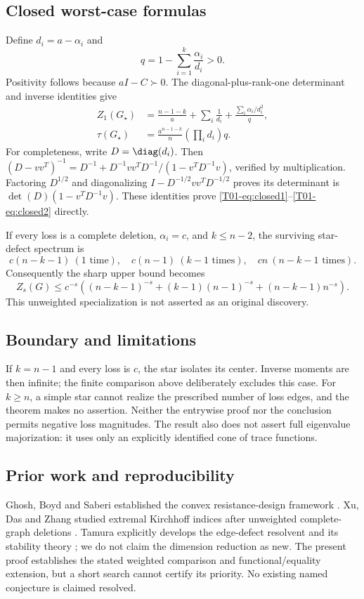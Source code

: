 \documentclass[11pt,a4paper]{article}
\theoremstyle{definition}\newtheorem{definition}[theorem]{Definition}
\theoremstyle{remark}\newtheorem{remark}[theorem]{Remark}
\numberwithin{equation}{section}
\begin{document}
\subsection{Closed worst-case formulas}\label{T01-sec-4}
Define $d_i=a-\alpha_i$ and
\[
 q=1-\sum_{i=1}^k\frac{\alpha_i}{d_i}>0.
\]
Positivity follows because $aI-C\succ0$. The diagonal-plus-rank-one determinant and inverse identities give
\begin{align}
 Z_1(G_\star)&=\frac{n-1-k}{a}+\sum_i\frac1{d_i}
 +\frac{\sum_i\alpha_i/d_i^2}{q},\label{T01-eq:closed1}\\
 \tau(G_\star)&=\frac{a^{n-1-k}}n\left(\prod_i d_i\right)q.\label{T01-eq:closed2}
\end{align}
For completeness, write $D=\diag(d_i)$. Then
$(D-vv^T)^{-1}=D^{-1}+D^{-1}vv^TD^{-1}/(1-v^TD^{-1}v)$, verified by multiplication. Factoring $D^{1/2}$ and diagonalizing $I-D^{-1/2}vv^TD^{-1/2}$ proves its determinant is $\det(D)(1-v^TD^{-1}v)$. These identities prove \eqref{T01-eq:closed1}--\eqref{T01-eq:closed2} directly.

If every loss is a complete deletion, $\alpha_i=c$, and $k\le n-2$, the surviving star-defect spectrum is
\[
 c(n-k-1)\ (1\text{ time}),\quad c(n-1)\ (k-1\text{ times}),\quad
 cn\ (n-k-1\text{ times}).
\]
Consequently the sharp upper bound becomes
\[
 Z_s(G)\le c^{-s}\left((n-k-1)^{-s}+(k-1)(n-1)^{-s}+(n-k-1)n^{-s}\right).
\]
This unweighted specialization is not asserted as an original discovery.

\subsection{Boundary and limitations}\label{T01-sec-5}
If $k=n-1$ and every loss is $c$, the star isolates its center. Inverse moments are then infinite; the finite comparison above deliberately excludes this case. For $k\ge n$, a simple star cannot realize the prescribed number of loss edges, and the theorem makes no assertion. Neither the entrywise proof nor the conclusion permits negative loss magnitudes. The result also does not assert full eigenvalue majorization: it uses only an explicitly identified cone of trace functions.

\subsection{Prior work and reproducibility}\label{T01-sec-6}
Ghosh, Boyd and Saberi established the convex resistance-design framework \cite{ref036}. Xu, Das and Zhang studied extremal Kirchhoff indices after unweighted complete-graph deletions \cite{ref037}. Tamura explicitly develops the edge-defect resolvent and its stability theory \cite{ref038}; we do not claim the dimension reduction as new. The present proof establishes the stated weighted comparison and functional/equality extension, but a short search cannot certify its priority. No existing named conjecture is claimed resolved.
\end{document}
